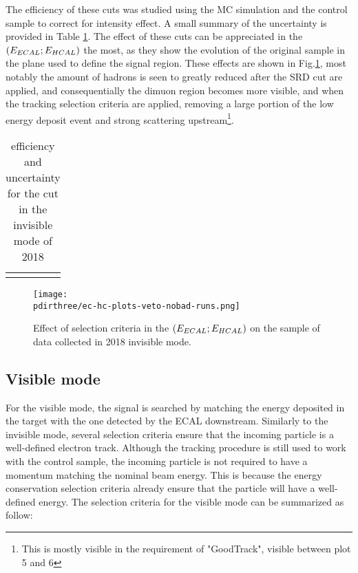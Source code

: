The efficiency of these cuts was studied using the MC simulation and the control sample to correct for intensity effect. A small summary of the uncertainty is provided in Table \ref{tab:inv-cut-eff}. The effect of these cuts can be appreciated in the $(E_{ECAL};E_{HCAL})$ the most, as they show the evolution of the original sample in the plane used to define the signal region. These effects are shown in Fig.\ref{fig:inv-cut-ehcal}, most notably the amount of hadrons is seen to greatly reduced after the SRD cut are applied, and consequentially the dimuon region becomes more visible, and when the tracking selection criteria are applied, removing a large portion of the low energy deposit event and strong scattering upstream\footnote{This is mostly visible in the requirement of "GoodTrack", visible between plot 5 and 6}.


\begin{table}[bth!]
  \centering
  \begin{tabular}{|lrr|}
    &&
  \end{tabular}
  \caption[efficiency cuts invisible mode]{efficiency and uncertainty for the cut in the invisible mode of 2018}
  \label{tab:inv-cut-eff}
\end{table}


\begin{figure}[bth!]
  \centering
  \texttt{[image: \\pdirthree/ec-hc-plots-veto-nobad-runs.png]}
  \caption[effect of the cuts in invisible mode]{Effect of selection criteria in the $(E_{ECAL};E_{HCAL})$ on the sample of data collected in 2018 invisible mode.\cite{NA64:2019imj}}
  \label{fig:inv-cut-ehcal}
\end{figure}

\subsection{Visible mode}
\label{ch3:sec:selection-criteria-vis}

For the visible mode, the signal is searched by matching the energy deposited in the target with the one detected by the ECAL downstream. Similarly to the invisible mode, several selection criteria ensure that the incoming particle is a well-defined electron track. Although the tracking procedure is still used to work with the control sample, the incoming particle is not required to have a momentum matching the nominal beam energy. This is because the energy conservation selection criteria already ensure that the particle will have a well-defined energy. The selection criteria for the visible mode can be summarized as follow:

